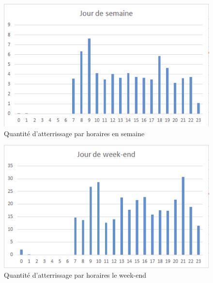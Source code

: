 \begin{figure}[H]
\centering \includegraphics[scale=0.6]{arrivee_semaine.png}
 \caption{\label{arrivee_semaine} Quantité d'atterrissage par horaires en semaine} 
\end{figure}
 
\begin{figure}[H]
\centering \includegraphics[scale=0.6]{arrivee_we.png}
 \caption{\label{arrivee_we} Quantité d'atterrissage par horaires le week-end} 
\end{figure}
